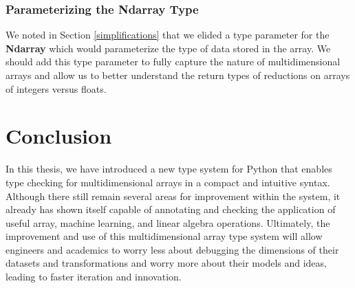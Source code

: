 \documentclass[12pt]{report}
\begin{document}
\subsection{Parameterizing the Ndarray Type}

We noted in Section \ref{simplifications} that we elided a type parameter for the \textbf{Ndarray} which would parameterize the type of data stored in the array. We should add this type parameter to fully capture the nature of multidimensional arrays and allow us to better understand the return types of reductions on arrays of integers versus floats.

\chapter{Conclusion}

In this thesis, we have introduced a new type system for Python that enables type checking for multidimensional arrays in a compact and intuitive syntax. Although there still remain several areas for improvement within the system, it already has shown itself capable of annotating and checking the application of useful array, machine learning, and linear algebra operations. Ultimately, the improvement and use of this multidimensional array type system will allow engineers and academics to worry less about debugging the dimensions of their datasets and transformations and worry more about their models and ideas, leading to faster iteration and innovation.




\end{document}
